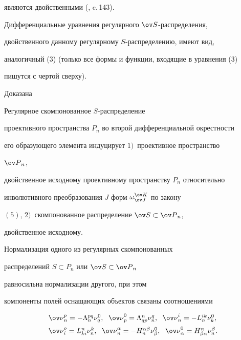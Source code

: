 являются двойственными (\cite{rab15}, c.\,143).


Дифференциальные уравнения регулярного $\ov S$-распределения,


двойственного данному регулярному $S$-распределению, имеют вид,


аналогичный (3) (только все формы и функции, входящие в уравнения (3)


пишутся с чертой сверху).


Доказана





\begin{thm}


Регулярное скомпонованное $S$-распределение


проективного пространства $P_n$ во второй дифференциальной окрестности


его образующего элемента индуцирует $1)$~проективное пространство


${\ov P}_n$,


двойственное исходному проективному пространству $P_n$ относительно


инволютивного преобразования $J$ форм $\omega^{\ov K}_{\ov J}$ по закону


$(5)$, $2)$~скомпонованное распределение $\ov S \subset {\ov P}_n$,


двойственное исходному.


\end{thm}





\begin{thm}


Нормализация одного из регулярных скомпонованных


распределений $S \subset P_n$ или $\ov S \subset {\ov P}_n$


равносильна нормализации другого, при этом


компоненты полей оснащающих объектов связаны соотношениями


$$


\begin{array}{l}


{\ov \nu}^p_n=-\Lambda^{pq}_n\nu^0_q,\ \;


{\ov \nu}^0_p=\Lambda^n_{qp}\nu^q_n,\ \;


{\ov \nu}^i_n=-L^{ik}_n\nu^0_k, \\[2mm]


%


{\ov \nu}^o_i=L^n_{ki}\nu^k_n,\ \;


{\ov \nu}^\alpha_n=-H^{\alpha \beta}_n \nu^0_\beta,\ \;


{\ov \nu}^0_\alpha=H^n_{\beta \alpha} \nu^\beta_n.


\end{array}


$$


\end{thm}





